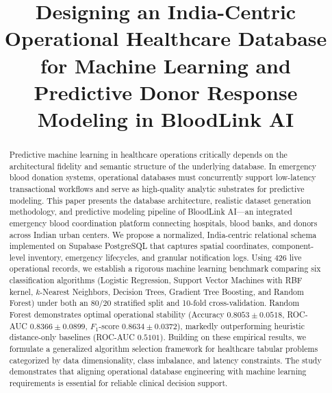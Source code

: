 \documentclass[conference]{IEEEtran}
\begin{document}
\title{Designing an India-Centric Operational Healthcare Database for Machine Learning and Predictive Donor Response Modeling in BloodLink AI}

\author{
    \and
}

\maketitle

\begin{abstract}
Predictive machine learning in healthcare operations critically depends on the architectural fidelity and semantic structure of the underlying database. In emergency blood donation systems, operational databases must concurrently support low-latency transactional workflows and serve as high-quality analytic substrates for predictive modeling. This paper presents the database architecture, realistic dataset generation methodology, and predictive modeling pipeline of BloodLink AI---an integrated emergency blood coordination platform connecting hospitals, blood banks, and donors across Indian urban centers. We propose a normalized, India-centric relational schema implemented on Supabase PostgreSQL that captures spatial coordinates, component-level inventory, emergency lifecycles, and granular notification logs. Using 426 live operational records, we establish a rigorous machine learning benchmark comparing six classification algorithms (Logistic Regression, Support Vector Machines with RBF kernel, $k$-Nearest Neighbors, Decision Trees, Gradient Tree Boosting, and Random Forest) under both an 80/20 stratified split and 10-fold cross-validation. Random Forest demonstrates optimal operational stability (Accuracy $0.8053 \pm 0.0518$, ROC-AUC $0.8366 \pm 0.0899$, $F_1$-score $0.8634 \pm 0.0372$), markedly outperforming heuristic distance-only baselines (ROC-AUC $0.5101$). Building on these empirical results, we formulate a generalized algorithm selection framework for healthcare tabular problems categorized by data dimensionality, class imbalance, and latency constraints. The study demonstrates that aligning operational database engineering with machine learning requirements is essential for reliable clinical decision support.
\end{abstract}
\end{document}
